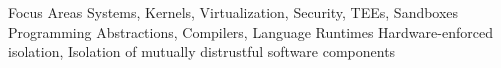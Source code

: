 


\begin{cvskills}

\cvskill
{Focus Areas}
{Systems, Kernels, Virtualization, Security, TEEs, Sandboxes\linebreak 
 Programming Abstractions, Compilers, Language Runtimes\linebreak
  Hardware-enforced isolation, Isolation of mutually distrustful software components\linebreak
}

\end{cvskills}

